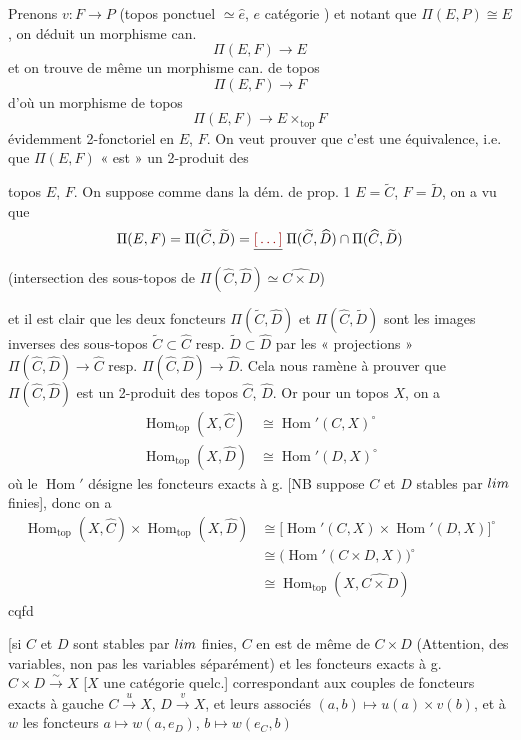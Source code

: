 \documentclass[11pt,a4paper]{article}
\begin{document}
Prenons $v : F \to P$ (topos ponctuel $\simeq \widehat{e}$, $e$ catégorie
) et notant que $\Pi(E,P) \cong E$, on déduit un morphisme
can.
\[
\Pi(E,F) \longrightarrow E
\]
et on trouve de même un morphisme can. de topos
\[
\Pi(E,F) \longrightarrow F
\]
d'où un morphisme de topos
\[
\Pi(E,F) \longrightarrow E \times_{\mathrm{top}} F
\]
évidemment 2-fonctoriel en $E$, $F$. On veut prouver que c'est une
\struck{\ill{}} équivalence, i.e. que $\Pi(E,F)$ « est » un 2-produit des

topos $E$, $F$. On suppose comme dans la dém. de prop. 1 $E = \widetilde{C}$,
$F = \widetilde{D}$,  on a vu que \ill{}
\[
\Pi(E,F) = \Pi(\widetilde{C}, \widetilde{D}) = \struck{\ill{}}\;
\Pi(\widetilde{C}, \widehat{D}) \cap \Pi(\widehat{C}, \widetilde{D})
\]
(intersection des sous-topos de $\Pi(\widehat{C}, \widehat{D}) \simeq
\widehat{C \times D}$)

et il est clair que les deux foncteurs $\Pi(\widetilde{C}, \widehat{D})$ et
$\Pi(\widehat{C}, \widetilde{D})$ sont les images inverses des sous-topos
$\widetilde{C} \subset \widehat{C}$ resp. $\widetilde{D} \subset \widehat{D}$
par les « projections » $\Pi(\widehat{C}, \widehat{D}) \to \widehat{C}$ resp.
$\Pi(\widehat{C}, \widehat{D}) \to \widehat{D}$. Cela nous ramène à
 prouver que $\Pi(\widehat{C}, \widehat{D})$ est un
2-produit des topos $\widehat{C}$, $\widehat{D}$. Or pour un topos
$X$, on a
\begin{align}
\operatorname{Hom}_{\mathrm{top}}(X, \widehat{C}) &\cong \operatorname{Hom}'(C, X)^{\circ} \nonumber\\
\operatorname{Hom}_{\mathrm{top}}(X, \widehat{D}) &\cong \operatorname{Hom}'(D, X)^{\circ} \nonumber
\end{align}
où le $\operatorname{Hom}'$ désigne les foncteurs exacts à g. [NB \ill{}
suppose $C$ et $D$ stables par $\varprojlim$ finies], donc on a
\begin{align}
\operatorname{Hom}_{\mathrm{top}}(X, \widehat{C}) \times \operatorname{Hom}_{\mathrm{top}}(X, \widehat{D})
&\cong \bigl[\operatorname{Hom}'(C,X) \times \operatorname{Hom}'(D,X)\bigr]^{\circ} \nonumber\\
&\cong \bigl(\operatorname{Hom}'(C \times D, X)\bigr)^{\circ} \nonumber\\
&\cong \operatorname{Hom}_{\mathrm{top}}(X, \widehat{C \times D}) \nonumber
\end{align}
cqfd

[si $C$ et $D$ sont stables par $\varprojlim$ finies,  $C$ en est de
même de $C \times D$ (Attention, \ill{} des variables, non pas \ill{} les
variables séparément) et les foncteurs exacts à g. $C \times D
\xrightarrow{\ \sim\ } X$ [$X$ une catégorie quelc.] correspondant aux
 couples de foncteurs exacts à gauche $C \xrightarrow{\ u\ } X$,
$D \xrightarrow{\ v\ } X$, et leurs associés \struck{\ill{}} $(a,b) \mapsto
u(a) \times v(b)$, et à $w$ les foncteurs $a \mapsto w(a, e_{D})$, $b \mapsto
w(e_{C}, b)$
\end{document}
